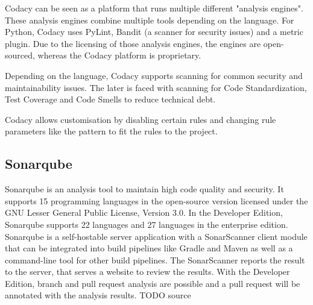 Codacy can be seen as a platform that runs multiple different "analysis engines". These analysis engines combine multiple tools depending on the language. For Python, Codacy uses  PyLint, Bandit (a scanner for security issues) and a metric plugin.
Due to the licensing of those analysis engines, the engines are open-sourced, whereas the Codacy platform is proprietary.

Depending on the language, Codacy supports scanning for common security and maintainability issues. The later is faced with scanning for Code Standardization, Test Coverage and Code Smells to reduce technical debt.

Codacy allows customisation by disabling certain rules and changing rule parameters like the pattern to fit the rules to the project. 

\subsection{Sonarqube}
Sonarqube is an analysis tool to maintain high code quality and security. It supports 15 programming languages in the open-source version licensed under the GNU Lesser General Public License, Version 3.0. In the Developer Edition, Sonarqube supports 22 languages and 27 languages in the enterprise edition. Sonarqube is a self-hostable server application with a SonarScanner client module that can be integrated into build pipelines like Gradle and Maven as well as a command-line tool for other build pipelines. The SonarScanner reports the result to the server, that serves a website to review the results. With the Developer Edition, branch and pull request analysis are possible and a pull request will be annotated with the analysis results. TODO source

